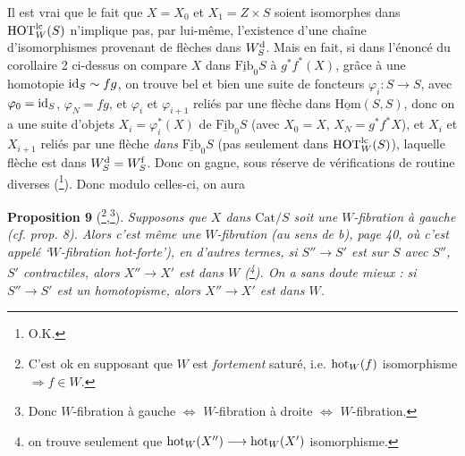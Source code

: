 Il est vrai que le fait que $X = X_0$ et $X_1 = Z \times S$ soient isomorphes dans $\mathrm{HOT}^{\mathrm{lc}}_W(S)$ n'implique pas, par lui-même, l'existence d'une  chaîne d'isomorphismes provenant de flèches dans $W^{\mathrm{d}}_S$. Mais en fait, si dans l'énoncé du corollaire 2 ci-dessus on compare $X$ dans $\underline{\mathrm{Fib}}_0S$ à $g^*f^*(X)$, grâce à une homotopie $\mathrm{id}_S \sim fg$, on trouve bel et bien une suite de foncteurs $\varphi_i : S \longrightarrow S$, avec $\varphi_0 = \mathrm{id}_S$, $\varphi_N = fg$, et $\varphi_i$ et $\varphi_{i+1}$ reliés par une flèche dans $\underline{\mathrm{Hom}}(S,S)$, donc on a une suite d'objets $X_i = \varphi_i^*(X)$ de $\underline{\mathrm{Fib}}_0S$ (avec $X_0 = X$, $X_N = g^*f^*X$), et $X_i$ et $X_{i+1}$ reliés par une flèche \textit{dans} $\underline{\mathrm{Fib}}_0S$ (pas seulement dans $\mathrm{HOT}^{\mathrm{lc}}_W(S)$), laquelle flèche est dans $W^{\mathrm{d}}_S = W^{\mathrm{f}}_S$. Donc on gagne, sous réserve de vérifications de routine diverses (\footnote[55]{O.K.}). Donc modulo celles-ci, on aura

\textbf{Proposition 9} (\footnote[56]{C'est ok en supposant que $W$ est \textit{fortement} saturé, i.e. $\mathrm{hot}_W(f)$ isomorphisme $\Longrightarrow f \in W$.},\footnote[57]{Donc $W$-fibration à gauche $\Longleftrightarrow$ $W$-fibration à droite $\Longleftrightarrow$ $W$-fibration.}). \textit{Supposons que $X$ dans $\mathrm{Cat}/S$ soit une $W$-fibration à gauche (cf. prop. 8). Alors c'est même une $W$-fibration (au sens de b), page 40, où c'est appelé `$W$-fibration \textup{hot}-forte'), en d'autres termes, si $S'' \longrightarrow S'$ est sur $S$ avec $S''$, $S'$ contractiles, alors $X'' \longrightarrow X'$ est dans $W$ (\footnote[58]{on trouve seulement que $\mathrm{hot}_W(X'') \longrightarrow \mathrm{hot}_W(X')$ isomorphisme.}). On a sans doute mieux : si $S'' \longrightarrow S'$ est un homotopisme, alors $X'' \longrightarrow X'$ est dans $W$.}

